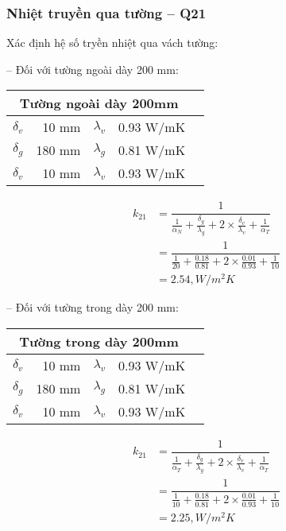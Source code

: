 \subsubsection{Nhiệt truyền qua tường -- Q{\scriptsize 21}}

Xác định hệ số tryền nhiệt qua vách tường:

-- Đối với tường ngoài dày 200 mm:
\begin{table}[H]
	\centering
	\begin{tabular}{|r|r|r|r|r|}
		\hline
		\multicolumn{4}{|c|}{\textbf{Tường ngoài dày 200mm}} \bigstrut\\
		\hline
		{\large $\delta_{v}$} & 10 mm & \textbf{{\large $\lambda_{v}$}} & 0.93 W/mK \bigstrut\\
		\hline
		\textbf{{\large $\delta_{g}$}} & 180 mm & {\large $\lambda_{g}$} & 0.81 W/mK \bigstrut\\
		\hline
		{\large $\delta_{v}$} & 10 mm & \textbf{{\large $\lambda_{v}$}} & 0.93 W/mK \bigstrut\\
		\hline
	\end{tabular}
\end{table}
\vspace{-0.5cm}
{\Large \begin{equation*}
	\begin{split}
	k_{21} &= \dfrac{1}{\frac{1}{\alpha_{N}} + \frac{\delta_{g}}{\lambda_{g}} + 2\times\frac{\delta_{v}}{\lambda_{v}} + \frac{1}{\alpha_{T}}}\\
	&=\dfrac{1}{\frac{1}{20} + \frac{0.18}{0.81} + 2\times\frac{0.01}{0.93} + \frac{1}{10}}\\
	&={\scriptstyle 2.54, W/m^2 K}
	\end{split}
\end{equation*}}

-- Đối với tường trong dày 200 mm:
\begin{table}[H]
	\centering
	\begin{tabular}{|r|r|r|r|r|}
		\hline
		\multicolumn{4}{|c|}{\textbf{Tường trong dày 200mm}} \bigstrut\\
		\hline
		{\large $\delta_{v}$} & 10 mm & \textbf{{\large $\lambda_{v}$}} & 0.93 W/mK \bigstrut\\
		\hline
		\textbf{{\large $\delta_{g}$}} & 180 mm & {\large $\lambda_{g}$} & 0.81 W/mK \bigstrut\\
		\hline
		{\large $\delta_{v}$} & 10 mm & \textbf{{\large $\lambda_{v}$}} & 0.93 W/mK \bigstrut\\
		\hline
	\end{tabular}
\end{table}
\vspace{-0.5cm}
{\Large \begin{equation*}
	\begin{split}
		k_{21} &= \dfrac{1}{\frac{1}{\alpha_{T}} + \frac{\delta_{g}}{\lambda_{g}} + 2\times\frac{\delta_{v}}{\lambda_{v}} + \frac{1}{\alpha_{T}}}\\
		&=\dfrac{1}{\frac{1}{10} + \frac{0.18}{0.81} + 2\times\frac{0.01}{0.93} + \frac{1}{10}}\\
		&={\scriptstyle 2.25,  W/m^2 K}
	\end{split}
\end{equation*}}


